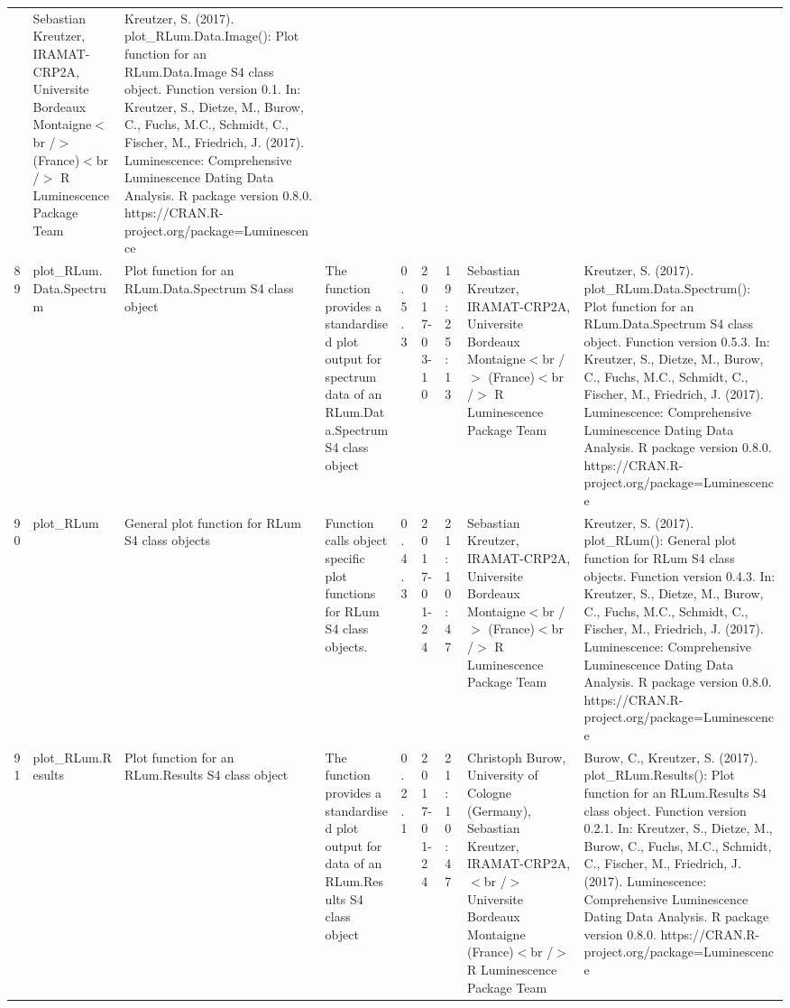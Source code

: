 \begin{table}[ht]
\begin{tabular}{rllllllll}
 & Sebastian Kreutzer, IRAMAT-CRP2A, Universite Bordeaux Montaigne$<$br /$>$ (France)$<$br /$>$  R Luminescence Package Team & Kreutzer, S. (2017). plot\_RLum.Data.Image(): Plot function for an RLum.Data.Image S4 class object. Function version 0.1. In: Kreutzer, S., Dietze, M., Burow, C., Fuchs, M.C., Schmidt, C., Fischer, M., Friedrich, J. (2017). Luminescence: Comprehensive Luminescence Dating Data Analysis. R package version 0.8.0. https://CRAN.R-project.org/package=Luminescence
 \\ 
  89 & plot\_RLum.Data.Spectrum & Plot function for an RLum.Data.Spectrum S4 class object & The function provides a standardised plot output for spectrum data of an RLum.Data.Spectrum S4 class object & 0.5.3 & 2017-03-10 & 19:25:13
 & Sebastian Kreutzer, IRAMAT-CRP2A, Universite Bordeaux Montaigne$<$br /$>$ (France)$<$br /$>$  R Luminescence Package Team & Kreutzer, S. (2017). plot\_RLum.Data.Spectrum(): Plot function for an RLum.Data.Spectrum S4 class object. Function version 0.5.3. In: Kreutzer, S., Dietze, M., Burow, C., Fuchs, M.C., Schmidt, C., Fischer, M., Friedrich, J. (2017). Luminescence: Comprehensive Luminescence Dating Data Analysis. R package version 0.8.0. https://CRAN.R-project.org/package=Luminescence
 \\ 
  90 & plot\_RLum & General plot function for RLum S4 class objects & Function calls object specific plot functions for RLum S4 class objects. & 0.4.3 & 2017-01-24 & 21:10:47
 & Sebastian Kreutzer, IRAMAT-CRP2A, Universite Bordeaux Montaigne$<$br /$>$ (France)$<$br /$>$  R Luminescence Package Team & Kreutzer, S. (2017). plot\_RLum(): General plot function for RLum S4 class objects. Function version 0.4.3. In: Kreutzer, S., Dietze, M., Burow, C., Fuchs, M.C., Schmidt, C., Fischer, M., Friedrich, J. (2017). Luminescence: Comprehensive Luminescence Dating Data Analysis. R package version 0.8.0. https://CRAN.R-project.org/package=Luminescence
 \\ 
  91 & plot\_RLum.Results & Plot function for an RLum.Results S4 class object & The function provides a standardised plot output for data of an RLum.Results S4 class object & 0.2.1 & 2017-01-24 & 21:10:47
 & Christoph Burow, University of Cologne (Germany), Sebastian Kreutzer, IRAMAT-CRP2A,$<$br /$>$ Universite Bordeaux Montaigne (France)$<$br /$>$  R Luminescence Package Team & Burow, C., Kreutzer, S. (2017). plot\_RLum.Results(): Plot function for an RLum.Results S4 class object. Function version 0.2.1. In: Kreutzer, S., Dietze, M., Burow, C., Fuchs, M.C., Schmidt, C., Fischer, M., Friedrich, J. (2017). Luminescence: Comprehensive Luminescence Dating Data Analysis. R package version 0.8.0. https://CRAN.R-project.org/package=Luminescence

\end{tabular}
\end{table}

